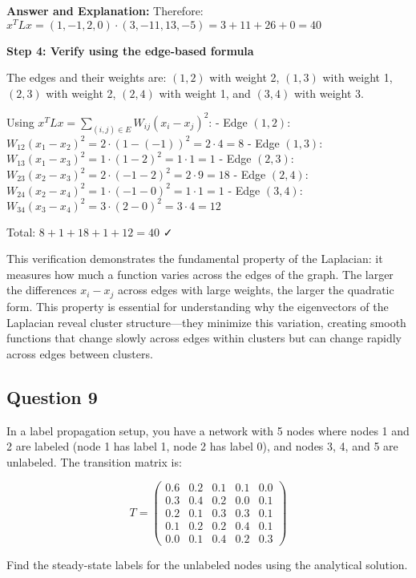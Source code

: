\documentclass[11pt]{article}
\newenvironment{answer}{\color{answercolor}\begin{framed}\textbf{Answer and Explanation:}}{\end{framed}}
\begin{document}
\begin{answer}
Therefore: $x^T L x = (1, -1, 2, 0) \cdot (3, -11, 13, -5) = 3 + 11 + 26 + 0 = 40$

\textbf{Step 4: Verify using the edge-based formula}

The edges and their weights are: $(1,2)$ with weight 2, $(1,3)$ with weight 1, $(2,3)$ with weight 2, $(2,4)$ with weight 1, and $(3,4)$ with weight 3.

Using $x^T L x = \sum_{(i,j) \in E} W_{ij}(x_i - x_j)^2$:
- Edge $(1,2)$: $W_{12}(x_1 - x_2)^2 = 2 \cdot (1 - (-1))^2 = 2 \cdot 4 = 8$
- Edge $(1,3)$: $W_{13}(x_1 - x_3)^2 = 1 \cdot (1 - 2)^2 = 1 \cdot 1 = 1$
- Edge $(2,3)$: $W_{23}(x_2 - x_3)^2 = 2 \cdot (-1 - 2)^2 = 2 \cdot 9 = 18$
- Edge $(2,4)$: $W_{24}(x_2 - x_4)^2 = 1 \cdot (-1 - 0)^2 = 1 \cdot 1 = 1$
- Edge $(3,4)$: $W_{34}(x_3 - x_4)^2 = 3 \cdot (2 - 0)^2 = 3 \cdot 4 = 12$

Total: $8 + 1 + 18 + 1 + 12 = 40$ ✓

This verification demonstrates the fundamental property of the Laplacian: it measures how much a function varies across the edges of the graph. The larger the differences $x_i - x_j$ across edges with large weights, the larger the quadratic form. This property is essential for understanding why the eigenvectors of the Laplacian reveal cluster structure—they minimize this variation, creating smooth functions that change slowly across edges within clusters but can change rapidly across edges between clusters.
\end{answer}

\subsection{Question 9}
In a label propagation setup, you have a network with 5 nodes where nodes 1 and 2 are labeled (node 1 has label 1, node 2 has label 0), and nodes 3, 4, and 5 are unlabeled. The transition matrix is:

$$T = \begin{pmatrix}
0.6 & 0.2 & 0.1 & 0.1 & 0.0 \\
0.3 & 0.4 & 0.2 & 0.0 & 0.1 \\
0.2 & 0.1 & 0.3 & 0.3 & 0.1 \\
0.1 & 0.2 & 0.2 & 0.4 & 0.1 \\
0.0 & 0.1 & 0.4 & 0.2 & 0.3
\end{pmatrix}$$

Find the steady-state labels for the unlabeled nodes using the analytical solution.
\end{document}
